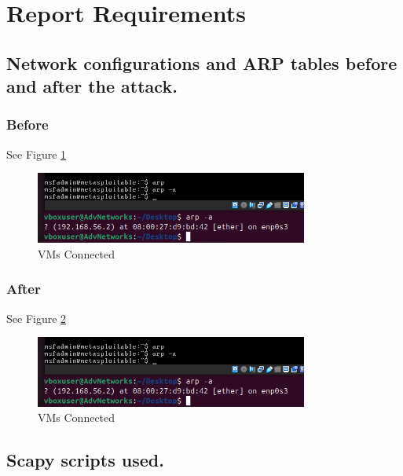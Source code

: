 \documentclass{article}
\begin{document}
\label{subsubsec:arp-mit}

\section*{Report Requirements}

\subsection*{Network configurations and ARP tables before and after the attack.}

\subsubsection*{Before}

See Figure \ref{fig:before}

\begin{figure}[h]
    \centering
    \includegraphics[width=0.8\textwidth]{task1/screenshot/before.png}
    \caption{VMs Connected}
    \label{fig:before}
\end{figure}

\subsubsection*{After}

See Figure \ref{fig:after}

\begin{figure}[h]
    \centering
    \includegraphics[width=0.8\textwidth]{task1/screenshot/before.png}
    \caption{VMs Connected}
    \label{fig:after}
\end{figure}

\subsection*{Scapy scripts used.}
\end{document}
